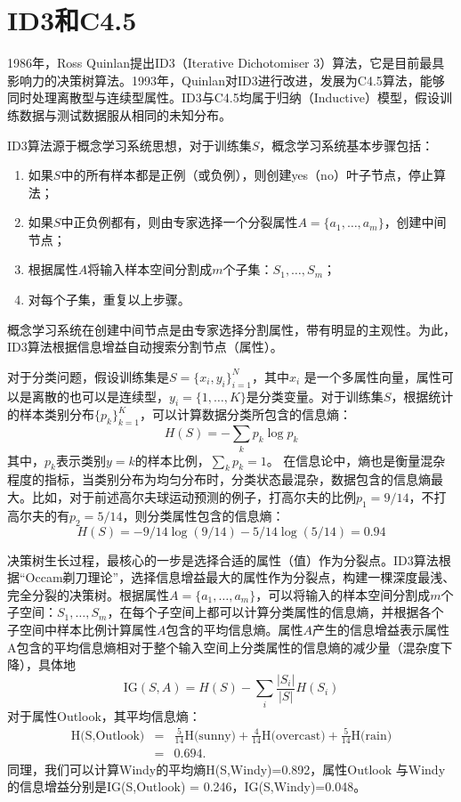 \section{ID3和C4.5}
1986年，Ross Quinlan提出ID3（Iterative Dichotomiser 3）算法\cite{quinlan1986induction}，它是目前最具影响力的决策树算法。1993年，Quinlan对ID3进行改进，发展为C4.5算法\cite{quinlan1993c4}，能够同时处理离散型与连续型属性。ID3与C4.5均属于归纳（Inductive）模型，假设训练数据与测试数据服从相同的未知分布。

ID3算法源于概念学习系统思想，对于训练集$S$，概念学习系统基本步骤包括：
\begin{enumerate}[Step 1.]
  \item 如果$S$中的所有样本都是正例（或负例），则创建yes（no）叶子节点，停止算法；
  \item 如果$S$中正负例都有，则由专家选择一个分裂属性$A=\{a_1,\ldots,a_m\}$，创建中间节点；
  \item 根据属性$A$将输入样本空间分割成$m$个子集：$S_1,\ldots,S_m$；
  \item 对每个子集，重复以上步骤。
\end{enumerate}
概念学习系统在创建中间节点是由专家选择分割属性，带有明显的主观性。为此，ID3算法根据信息增益自动搜索分割节点（属性）。

对于分类问题，假设训练集是$S=\{x_i,y_i\}_{i=1}^N$，其中$x_i$ 是一个多属性向量，属性可以是离散的也可以是连续型，$y_i=\{1,\ldots,K\}$是分类变量。对于训练集$S$，根据统计的样本类别分布$\{p_k\}_{k=1}^K$，可以计算数据分类所包含的信息熵：
\begin{equation}
    H(S) = -\sum\limits_k p_k \log p_k
\end{equation}
其中，$p_k$表示类别$y=k$的样本比例，$\sum\limits_k p_k = 1$。 在信息论中，熵也是衡量混杂程度的指标，当类别分布为均匀分布时，分类状态最混杂，数据包含的信息熵最大。比如，对于前述高尔夫球运动预测的例子，打高尔夫的比例$p_1=9/14$，不打高尔夫的有$p_2=5/14$，则分类属性包含的信息熵：
\begin{equation}
    H(S) = -9/14 \log(9/14) - 5/14 \log(5/14) = 0.94
\end{equation}

决策树生长过程，最核心的一步是选择合适的属性（值）作为分裂点。ID3算法根据“Occam剃刀理论”，选择信息增益最大的属性作为分裂点，构建一棵深度最浅、完全分裂的决策树。根据属性$A=\{a_1,\ldots,a_m\}$，可以将输入的样本空间分割成$m$个子空间：$S_1,\ldots,S_m$，在每个子空间上都可以计算分类属性的信息熵，并根据各个子空间中样本比例计算属性$A$包含的平均信息熵。属性$A$产生的信息增益表示属性A包含的平均信息熵相对于整个输入空间上分类属性的信息熵的减少量（混杂度下降），具体地
\begin{equation}
    \textrm{IG}(S,A) = H(S) - \sum\limits_i \frac{|S_i|}{|S|} H(S_i)
\end{equation}
对于属性Outlook，其平均信息熵：
\begin{eqnarray}
  \text{H(S,Outlook)} &=& \frac{5}{14} \text{H(sunny)} + \frac{4}{14} \text{H(overcast)} + \frac{5}{14} \text{H(rain)}\\
  &=& 0.694.
\end{eqnarray}
同理，我们可以计算Windy的平均熵H(S,Windy)=0.892，属性Outlook 与Windy的信息增益分别是IG(S,Outlook) = 0.246，IG(S,Windy)=0.048。

